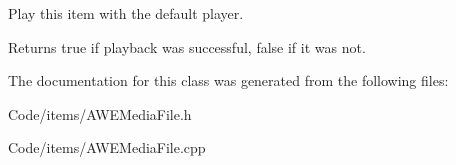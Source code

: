 Play this item with the default player. 

\begin{DoxyReturn}{Returns}
{\ttfamily true} if playback was successful, {\ttfamily false} if it was not. 
\end{DoxyReturn}


The documentation for this class was generated from the following files\-:\begin{DoxyCompactItemize}
\item 
Code/items/A\-W\-E\-Media\-File.\-h\item 
Code/items/A\-W\-E\-Media\-File.\-cpp\end{DoxyCompactItemize}
